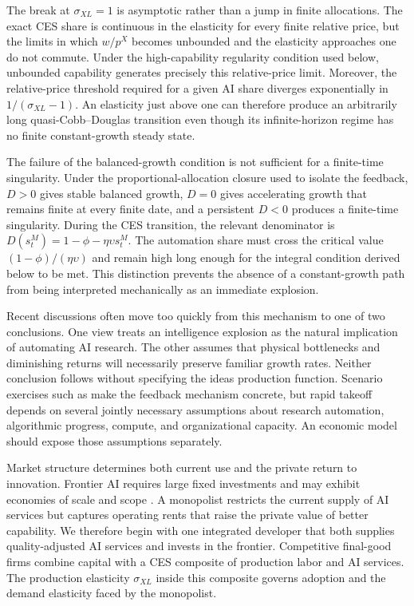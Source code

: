 The break at $\sigma_{XL}=1$ is asymptotic rather than a jump in finite allocations.
The exact CES share is continuous in the elasticity for every finite relative price,
but the limits in which $w/p^X$ becomes unbounded and the elasticity approaches one
do not commute. Under the high-capability regularity condition used below, unbounded
capability generates precisely this relative-price limit. Moreover, the relative-price threshold required for a given AI
share diverges exponentially in $1/(\sigma_{XL}-1)$. An elasticity just above one
can therefore produce an arbitrarily long quasi-Cobb--Douglas transition even though
its infinite-horizon regime has no finite constant-growth steady state.

The failure of the balanced-growth condition is not sufficient for a finite-time
singularity. Under the proportional-allocation closure used to isolate the feedback,
$D>0$ gives stable balanced growth, $D=0$ gives accelerating growth that remains
finite at every finite date, and a persistent $D<0$ produces a finite-time
singularity. During the CES transition, the relevant denominator is
$D(s^M_t)=1-\phi-\eta\upsilon s^M_t$. The automation share must cross the critical
value $(1-\phi)/(\eta\upsilon)$ and remain high long enough for the integral
condition derived below to be met. This distinction prevents the absence of a constant-growth path
from being interpreted mechanically as an immediate explosion.

Recent discussions often move too quickly from this mechanism to one of two
conclusions. One view treats an intelligence explosion as the natural implication of
automating AI research. The other assumes that physical bottlenecks and diminishing
returns will necessarily preserve familiar growth rates. Neither conclusion follows
without specifying the ideas production function. Scenario exercises such as
\citet{kokotajlo2025} make the feedback mechanism concrete, but rapid takeoff depends
on several jointly necessary assumptions about research automation, algorithmic
progress, compute, and organizational capacity. An economic model should expose those
assumptions separately.

Market structure determines both current use and the private return to innovation.
Frontier AI requires large fixed investments and may exhibit economies of scale and
scope \citep{korinekvipra2025,gans2024}. A monopolist restricts the current supply of
AI services but captures operating rents that raise the private value of better
capability. We therefore begin with one integrated developer that both supplies
quality-adjusted AI services and invests in the frontier. Competitive final-good
firms combine capital with a CES composite of production labor and AI services. The
production elasticity $\sigma_{XL}$ inside this composite governs adoption and the demand
elasticity faced by the monopolist.

